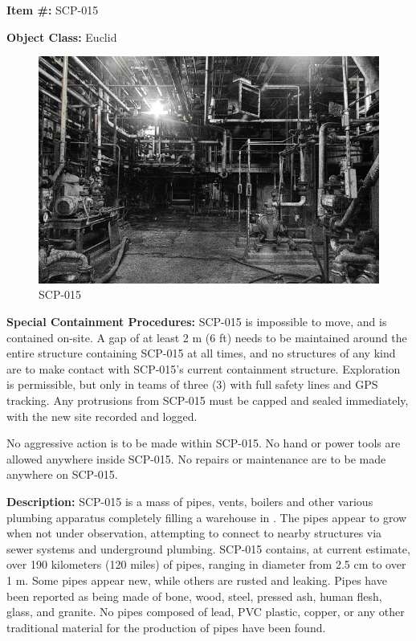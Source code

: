 
\textbf{Item \#:} SCP-015

\textbf{Object Class:} Euclid

\begin{figure}[h]
\begin{center}
\includegraphics[scale=0.4]{scp/015.jpg}
\linebreak SCP-015
\end{center}
\end{figure}

\textbf{Special Containment Procedures:} SCP-015 is impossible to move, and is contained on-site. A gap of at least 2 m (6 ft) needs to be maintained around the entire structure containing SCP-015 at all times, and no structures of any kind are to make contact with SCP-015's current containment structure. Exploration is permissible, but only in teams of three (3) with full safety lines and GPS tracking. Any protrusions from SCP-015 must be capped and sealed immediately, with the new site recorded and logged.

No aggressive action is to be made within SCP-015. No hand or power tools are allowed anywhere inside SCP-015. No repairs or maintenance are to be made anywhere on SCP-015.

\textbf{Description:} SCP-015 is a mass of pipes, vents, boilers and other various plumbing apparatus completely filling a warehouse in . The pipes appear to grow when not under observation, attempting to connect to nearby structures via sewer systems and underground plumbing. SCP-015 contains, at current estimate, over 190 kilometers (120 miles) of pipes, ranging in diameter from 2.5 cm to over 1 m. Some pipes appear new, while others are rusted and leaking. Pipes have been reported as being made of bone, wood, steel, pressed ash, human flesh, glass, and granite. No pipes composed of lead, PVC plastic, copper, or any other traditional material for the production of pipes have been found.

